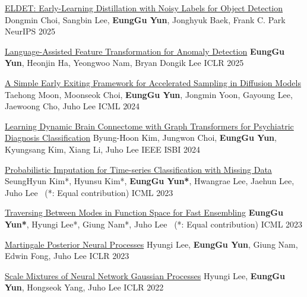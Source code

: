 \documentclass[11pt, a4paper]{cv}
\begin{document}

\begin{cvsubentries}

  \cvpublication
    {\href{https://openreview.net/forum?id=IWEc6kpy8O}{ELDET: Early-Learning Distillation with Noisy Labels for Object Detection}} %
    {Dongmin Choi, Sangbin Lee, \textbf{EungGu Yun}, Jonghyuk Baek, Frank C. Park} %
    {NeurIPS} %
    {2025} %
    {}

  \cvpublication
    {\href{https://arxiv.org/abs/2503.01184}{Language-Assisted Feature Transformation for Anomaly Detection}} %
    {\textbf{EungGu Yun}, Heonjin Ha, Yeongwoo Nam, Bryan Dongik Lee} %
    {ICLR} %
    {2025} %
    {}

  \cvpublication
    {\href{https://arxiv.org/abs/2408.05927}{A Simple Early Exiting Framework for Accelerated Sampling in Diffusion Models}} %
    {Taehong Moon, Moonseok Choi, \textbf{EungGu Yun}, Jongmin Yoon, Gayoung Lee, Jaewoong Cho, Juho Lee} %
    {ICML} %
    {2024} %
    {}

  \cvpublication
    {\href{https://doi.org/10.1109/ISBI56570.2024.10635508}{Learning Dynamic Brain Connectome with Graph Transformers for Psychiatric Diagnosis Classification}} %
    {Byung-Hoon Kim, Jungwon Choi, \textbf{EungGu Yun}, Kyungsang Kim, Xiang Li, Juho Lee} %
    {IEEE ISBI} %
    {2024} %
    {}

  \cvpublication
    {\href{https://arxiv.org/abs/2308.06738}{Probabilistic Imputation for Time-series Classification with Missing Data}} %
    {SeungHyun Kim*, Hyunsu Kim*, \textbf{EungGu Yun*}, Hwangrae Lee, Jaehun Lee, Juho Lee \, (*: Equal contribution)} %
    {ICML} %
    {2023} %
    {}

  \cvpublication
    {\href{https://arxiv.org/abs/2306.11304}{Traversing Between Modes in Function Space for Fast Ensembling}} %
    {\textbf{EungGu Yun*}, Hyungi Lee*, Giung Nam*, Juho Lee \, (*: Equal contribution)} %
    {ICML} %
    {2023} %
    {}

  \cvpublication
    {\href{https://arxiv.org/abs/2304.09431}{Martingale Posterior Neural Processes}} %
    {Hyungi Lee, \textbf{EungGu Yun}, Giung Nam, Edwin Fong, Juho Lee} %
    {\small{} \; ICLR} %
    {2023} %
    {}

  \cvpublication
    {\href{https://arxiv.org/abs/2107.01408}{Scale Mixtures of Neural Network Gaussian Processes}} %
    {Hyungi Lee, \textbf{EungGu Yun}, Hongseok Yang, Juho Lee} %
    {ICLR} %
    {2022} %
    {}

\end{cvsubentries}
\end{document}
